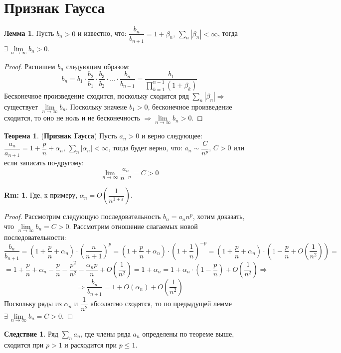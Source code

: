 \documentclass[12pt]{article}
\theoremstyle{definition}
\newtheorem{rem}{Rm:}
\newtheorem{lemma}{Лемма}
\newtheorem{theorem}{Теорема}
\newtheorem{corollary}{Следствие}
\begin{document}
\section*{Признак Гаусса}
\begin{lemma}
	Пусть $b_n > 0$ и известно, что: $\dfrac{b_n}{b_{n+1}} = 1 + \beta_n, \, \displaystyle\sum\limits_n |\beta_n| < \infty$, тогда $\exists \, \lim\limits_{n \to \infty} b_n > 0$.
\end{lemma}
\begin{proof}
	Распишем $b_n$ следующим образом:
	$$
		b_n = b_1{\cdot}\dfrac{b_2}{b_1}{\cdot}\dfrac{b_3}{b_2}{\cdot}\dotsc{\cdot}\dfrac{b_n}{b_{n-1}} = \dfrac{b_1}{\prod\limits_{k=1}^{n-1}(1+\beta_k)}
	$$
	Бесконечное произведение сходится, поскольку сходится ряд $\displaystyle\sum\limits_n |\beta_n| \Rightarrow$ существует $\lim\limits_{n\to \infty} b_n$. Поскольку значеие $b_1 > 0$, бесконечное произведение сходится, то оно не ноль и не бесконечность $\Rightarrow \lim\limits_{n\to \infty} b_n > 0$.
\end{proof}
\begin{theorem}(\textbf{Признак Гаусса})
	Пусть $a_n > 0$ и верно следующее:$\dfrac{a_n}{a_{n+1}} = 1 + \dfrac{p}{n} + \alpha_n, \, \sum\limits_n |\alpha_n| < \infty$, тогда будет верно, что: $a_n \sim \dfrac{C}{n^p}, \, C > 0$ или если записать по-другому:
	$$
		\lim\limits_{n \to \infty} \dfrac{a_n}{n^{-p}} = C > 0
	$$
\end{theorem}
\begin{rem}
	Где, к примеру, $\alpha_n = O\left(\dfrac{1}{n^{1 + \varepsilon}}\right)$.
\end{rem}
\begin{proof}
	Рассмотрим следующую последовательность $b_n = a_nn^p$, хотим доказать, что $\lim\limits_{n \to \infty}b_n = C > 0$. Рассмотрим отношение слагаемых новой последовательности:
	$$
		\dfrac{b_n}{b_{n+1}} = \left(1 + \dfrac{p}{n} + \alpha_n\right){\cdot}\left(\dfrac{n}{n+1}\right)^p = \left(1 + \dfrac{p}{n} + \alpha_n\right){\cdot}\left(1 + \dfrac{1}{n}\right)^{-p} =  \left(1 + \dfrac{p}{n} + \alpha_n\right){\cdot}\left(1 - \dfrac{p}{n} + O\left(\dfrac{1}{n^2}\right)\right) =
	$$
	$$
		=	1 + \dfrac{p}{n} + \alpha_n - \dfrac{p}{n} - \dfrac{p^2}{n^2} -\dfrac{\alpha_np}{n}  + O\left(\dfrac{1}{n^2}\right) = 1 + \alpha_n = 1 + \alpha_n{\cdot}\left(1 - \dfrac{p}{n}\right) + O\left(\dfrac{1}{n^2}\right) \Rightarrow
	$$
	$$
		\Rightarrow \dfrac{b_n}{b_{n+1}} = 1 + O\left(\alpha_n\right) + O\left(\dfrac{1}{n^2}\right)
	$$
	Поскольку ряды из $\alpha_n$ и $\dfrac{1}{n^2}$ абсолютно сходятся, то по предыдущей лемме $\exists \, \lim\limits_{n \to \infty}b_n = C > 0$.
\end{proof}
\begin{corollary}
	Ряд $\displaystyle \sum\limits_n a_n$, где члены ряда $a_n$ определены по теореме выше, сходится при $p > 1$ и расходится при $p \leq 1$.
\end{corollary}
\end{document}

